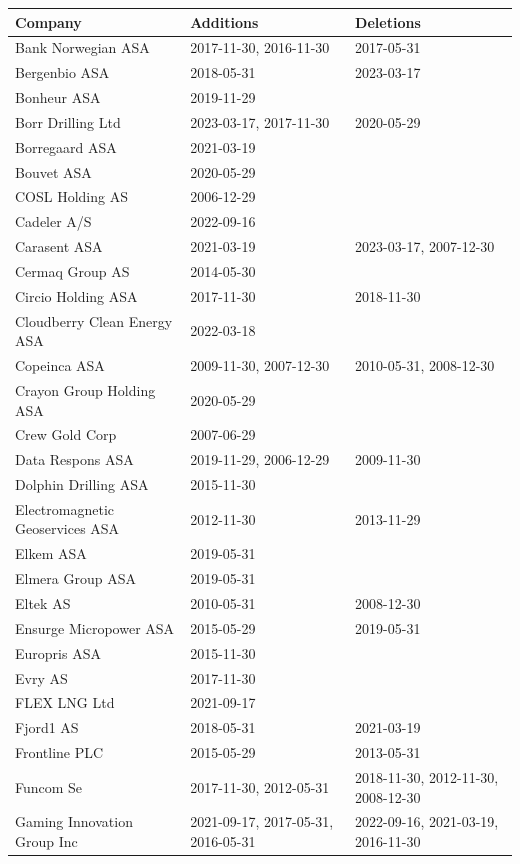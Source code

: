 \begin{table}[H]
\centering
\begin{tabularx}{\textwidth}{XXX}
\toprule
Company & Additions & Deletions \\ 
\midrule
Bank Norwegian ASA & 2017-11-30, 2016-11-30 & 2017-05-31 \\
Bergenbio ASA & 2018-05-31 & 2023-03-17 \\
Bonheur ASA & 2019-11-29 & \\
Borr Drilling Ltd & 2023-03-17, 2017-11-30 & 2020-05-29 \\
Borregaard ASA & 2021-03-19 & \\
Bouvet ASA & 2020-05-29 & \\
COSL Holding AS & 2006-12-29 & \\
Cadeler A/S & 2022-09-16 & \\
Carasent ASA & 2021-03-19 & 2023-03-17, 2007-12-30 \\
Cermaq Group AS & 2014-05-30 & \\
Circio Holding ASA & 2017-11-30 & 2018-11-30 \\
Cloudberry Clean Energy ASA & 2022-03-18 & \\
Copeinca ASA & 2009-11-30, 2007-12-30 & 2010-05-31, 2008-12-30 \\
Crayon Group Holding ASA & 2020-05-29 & \\
Crew Gold Corp & 2007-06-29 & \\
Data Respons ASA & 2019-11-29, 2006-12-29 & 2009-11-30 \\
Dolphin Drilling ASA & 2015-11-30 & \\
Electromagnetic Geoservices ASA & 2012-11-30 & 2013-11-29 \\
Elkem ASA & 2019-05-31 & \\
Elmera Group ASA & 2019-05-31 & \\
Eltek AS & 2010-05-31 & 2008-12-30 \\
Ensurge Micropower ASA & 2015-05-29 & 2019-05-31 \\
Europris ASA & 2015-11-30 & \\
Evry AS & 2017-11-30 & \\
FLEX LNG Ltd & 2021-09-17 & \\
Fjord1 AS & 2018-05-31 & 2021-03-19 \\
Frontline PLC & 2015-05-29 & 2013-05-31 \\
Funcom Se & 2017-11-30, 2012-05-31 & 2018-11-30, 2012-11-30, 2008-12-30 \\
Gaming Innovation Group Inc & 2021-09-17, 2017-05-31, 2016-05-31 & 2022-09-16, 2021-03-19, 2016-11-30 \\
\bottomrule
\end{tabularx}
\end{table}
\newpage
\clearpage

